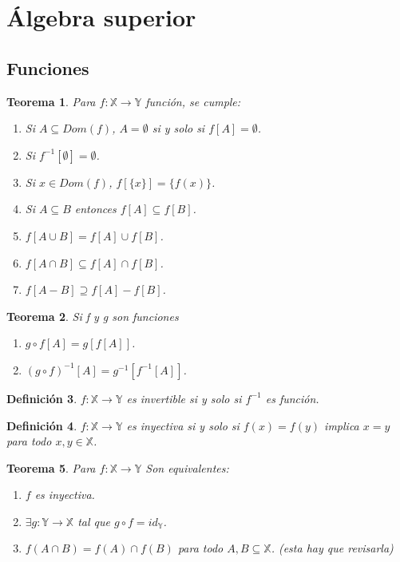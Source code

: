 \documentclass[landscape,twocolumn]{article}
\newtheorem{theorem}{Teorema}[section]
\newtheorem{definition}[theorem]{Definición}
\begin{document}
\section{Álgebra superior}
\subsection{Funciones}

\begin{theorem}
    Para $f: \mathbb{X} \rightarrow \mathbb{Y}$ función, se cumple:
    \begin{enumerate}
        \item Si $A \subseteq Dom(f)$, $A = \emptyset$ si y solo si $f[A] = \emptyset$.
        \item Si $f^{-1}[\emptyset] = \emptyset$.
        \item Si $x \in Dom(f)$, $f[\{x\}] = \{f(x)\}$.
        \item Si $A \subseteq B$ entonces $f[A] \subseteq f[B]$.
        \item $f[A \cup B] = f[A] \cup f[B]$.
        \item $f[A \cap B] \subseteq f[A] \cap f[B]$.
        \item $f[A - B] \supseteq f[A] - f[B]$.
    \end{enumerate}
\end{theorem}

\begin{theorem}
    Si f y g son funciones 
    \begin{enumerate}
        \item $g \circ f [A] = g[f[A]]$.
        \item $(g \circ f)^{-1}[A] = g^{-1}[f^{-1}[A]] $.
    \end{enumerate}
\end{theorem}

\begin{definition}
    $f: \mathbb{X} \rightarrow \mathbb{Y}$ es invertible si y solo si $f^{-1}$ es función.
\end{definition}

\begin{definition}
    $f: \mathbb{X} \rightarrow \mathbb{Y}$ es inyectiva si y solo si $f(x) = f(y)$ implica $x = y$ para todo $x, y \in \mathbb{X}$.
\end{definition}

\begin{theorem}
    Para $f: \mathbb{X} \rightarrow \mathbb{Y}$ Son equivalentes:
    \begin{enumerate}
        \item $f$ es inyectiva.
        \item $\exists g: \mathbb{Y} \rightarrow \mathbb{X}$ tal que $g \circ f = id_{\mathbb{Y}}$.
        \item $f(A \cap B) = f(A) \cap f(B)$ para todo $A, B \subseteq \mathbb{X}$. (esta hay que revisarla)
    \end{enumerate}
\end{theorem}
\end{document}
